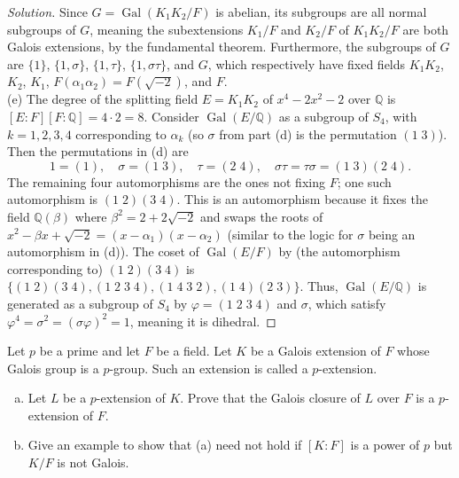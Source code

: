 \documentclass[10pt]{article}
\providecommand{\Gal}{\operatorname{Gal}}
\providecommand{\QQ}{\mathbb Q}
\providecommand{\ii}{\item}
\newenvironment{soln}{\begin{proof}[Solution]}{\end{proof}}
\begin{document}
\begin{soln}
    Since $G = \Gal(K_1K_2/F)$ is abelian,
    its subgroups are all normal subgroups of $G$,
    meaning the subextensions $K_1/F$ and $K_2/F$ of $K_1K_2/F$
    are both Galois extensions, by the fundamental theorem.
    Furthermore, the subgroups of $G$ are
    $\{1\}$, $\{1,\sigma\}$, $\{1,\tau\}$, $\{1,\sigma\tau\}$, and $G$,
    which respectively have fixed fields
    $K_1K_2$, $K_2$, $K_1$, $F(\alpha_1\alpha_2) = F(\sqrt{-2})$, and $F$.
    \\

    (e) The degree of the splitting field $E = K_1K_2$ of $x^4 - 2x^2 - 2$
    over $\QQ$ is $[E : F][F : \QQ] = 4\cdot 2 = 8$.
    Consider $\Gal(E/\QQ)$ as a subgroup of $S_4$,
    with $k=1,2,3,4$ corresponding to $\alpha_k$
    (so $\sigma$ from part (d) is the permutation $(1\;3)$).
    Then the permutations in (d) are
    \begin{equation*}
        1 = (1),\quad
	\sigma = (1\;3),\quad
	\tau = (2\;4),\quad
	\sigma\tau = \tau\sigma = (1\;3)(2\;4).
    \end{equation*}
    The remaining four automorphisms are the ones not fixing $F$;
    one such automorphism is $(1\;2)(3\;4)$.
    This is an automorphism because it fixes the field
    $\QQ(\beta)$ where $\beta^2 = 2 + 2\sqrt{-2}$
    and swaps the roots of $x^2 - \beta x + \sqrt{-2}
    = (x-\alpha_1)(x-\alpha_2)$ (similar to the logic for $\sigma$
    being an automorphism in (d)). The coset of $\Gal(E/F)$
    by (the automorphism corresponding to) $(1\; 2)(3\; 4)$
    is $\{(1\;2)(3\;4),(1\;2\;3\;4),(1\;4\;3\;2),(1\;4)(2\;3)\}$.
    Thus, $\Gal(E/\QQ)$ is generated as a subgroup of $S_4$ by
    $\varphi = (1\;2\;3\;4)$ and $\sigma$, which satisfy
    $\varphi^4 = \sigma^2 = (\sigma\varphi)^2 = 1$, meaning it is dihedral.
\end{soln}

\begin{problem}
    [14.4\#5]
    Let $p$ be a prime and let $F$ be a field.
    Let $K$ be a Galois extension of $F$ whose Galois group is a $p$-group.
    Such an extension is called a $p$-extension.
    \begin{enumerate}[(a)]
        \ii Let $L$ be a $p$-extension of $K$.
	Prove that the Galois closure of $L$ over $F$
	is a $p$-extension of $F$.
	\ii Give an example to show that (a) need not hold
	if $[K : F]$ is a power of $p$ but $K/F$ is not Galois.
    \end{enumerate}
\end{problem}
\end{document}
